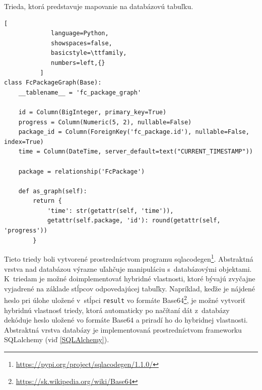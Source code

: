 \documentclass[slovak]{fitthesis}
\begin{document}
\begin{algorithm}
  \caption{Trieda, ktorá predstavuje mapovanie na databázovú tabuľku.}
  \label{abstractDBClass}
  \begin{lstlisting}[
             language=Python,
             showspaces=false,
             basicstyle=\ttfamily,
             numbers=left,{}
          ]
class FcPackageGraph(Base):
    __tablename__ = 'fc_package_graph'

    id = Column(BigInteger, primary_key=True)
    progress = Column(Numeric(5, 2), nullable=False)
    package_id = Column(ForeignKey('fc_package.id'), nullable=False, index=True)
    time = Column(DateTime, server_default=text("CURRENT_TIMESTAMP"))

    package = relationship('FcPackage')

    def as_graph(self):
        return {
            'time': str(getattr(self, 'time')),
            getattr(self.package, 'id'): round(getattr(self, 'progress'))
        }
  \end{lstlisting}
\end{algorithm}

Tieto triedy boli vytvorené prostredníctvom programu sqlacodegen\footnote{\url{https://pypi.org/project/sqlacodegen/1.1.0/}}. Abstraktná vrstva nad databázou výrazne uľahčuje manipuláciu s~databázovými objektami. K~triedam je možné doimplementovať hybridné vlastnosti, ktoré bývajú zvyčajne vyjadrené na základe stĺpcov odpovedajúcej tabuľky. Napríklad, keďže je nájdené heslo pri úlohe uložené v~stĺpci \texttt{result} vo formáte Base64\footnote{\url{https://sk.wikipedia.org/wiki/Base64}}, je možné vytvoriť hybridnú vlastnosť triedy, ktorá automaticky po načítaní dát z~databázy dekóduje heslo uložené vo formáte Base64 a priradí ho do hybridnej vlastnosti. Abstraktná vrstva databázy je implementovaná prostredníctvom frameworku SQLalchemy (viď \ref{SQLAlchemy}).
\end{document}
